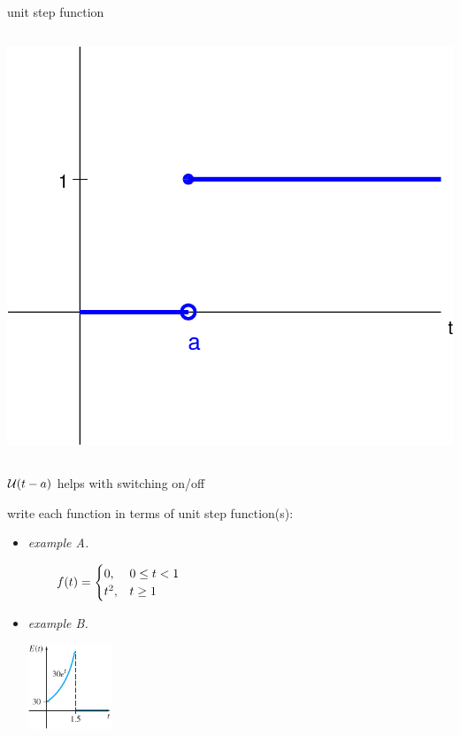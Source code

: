 \documentclass[dvipsnames,colorlinks]{beamer}
\begin{document}
\begin{frame}{unit step function}
\begin{columns}
\begin{column}{0.35\textwidth}
\vspace{4mm}
\includegraphics[width=\textwidth]{figs/unitsteptrans}
\end{column}
\end{columns}
\end{frame}


\begin{frame}{$\mathcal{U}(t-a)$ helps with switching on/off}

\small
write each function in terms of unit step function(s):
\begin{itemize}
\item \emph{example A.} %

\vspace{-3mm}
    $$f(t) = \begin{cases} 0, & 0 \le t < 1 \\ t^2, & t\ge 1 \end{cases} \hspace{70mm}$$

\vspace{6mm}
\item \emph{example B.} %

\includegraphics[width=25mm]{figs/Egoesoff}

\vspace{6mm}
\end{itemize}
\end{frame}
\end{document}

